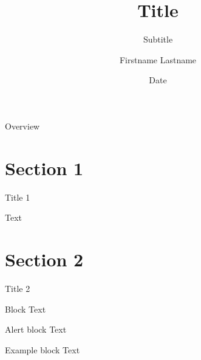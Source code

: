 \documentclass[beamer,aspectratio=169,compress,t]{beamer}
\title[Footer Title]{Title}
\subtitle{Subtitle}
\author[F.~Lastname]{Firstname Lastname}
\institute[MPI MIS]{MPI MIS Leipzig}
\date[Date]{Date}
\begin{document}
\begin{frame}[plain]
  \titlepage
\end{frame}

\begin{frame}{Overview}

  \tableofcontents
\end{frame}


\section{Section 1}


\begin{frame}{Title 1}

  Text


\end{frame}

\section{Section 2}

\begin{frame}{Title 2}

  \begin{block}{Block}
    Text
  \end{block}
  \pause
  
  \begin{alertblock}{Alert block}
    Text
  \end{alertblock}
  \pause

  \begin{exampleblock}{Example block}
    Text
  \end{exampleblock}
  \pause
  
\end{frame}
\end{document}
